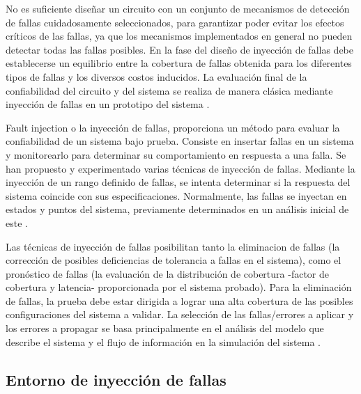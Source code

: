 \par No es suficiente diseñar un circuito con un conjunto de mecanismos de detección de fallas cuidadosamente seleccionados, para garantizar poder evitar los efectos críticos de las fallas, ya que los mecanismos implementados en general no pueden detectar todas las fallas posibles. En la fase del diseño de inyección de fallas debe establecerse un equilibrio entre la cobertura de fallas obtenida para los diferentes tipos de fallas y los diversos costos inducidos. La evaluación final de la confiabilidad del circuito y del sistema se realiza de manera clásica mediante inyección de fallas en un prototipo del sistema \cite{LIB05}.\\
\par Fault injection o la inyección de fallas, proporciona un método para evaluar la confiabilidad de un sistema bajo prueba. Consiste en insertar fallas en un sistema y monitorearlo para determinar su comportamiento en respuesta a una falla. Se han propuesto y experimentado varias técnicas de inyección de fallas. Mediante la inyección de un rango definido de fallas, se intenta determinar si la respuesta del sistema coincide con sus especificaciones. Normalmente, las fallas se inyectan en estados y puntos del sistema, previamente determinados en un análisis inicial de este \cite{LIB05}.\\

\par Las técnicas de inyección de fallas posibilitan tanto la eliminacion de fallas (la corrección de posibles deficiencias de tolerancia a fallas en el sistema), como el pronóstico de fallas (la evaluación de la distribución de cobertura -factor de cobertura y latencia- proporcionada por el sistema probado). Para la eliminación de fallas, la prueba debe estar dirigida a lograr una alta cobertura de las posibles configuraciones del sistema a validar. La selección de las fallas/errores a aplicar y los errores a propagar se basa principalmente en el análisis del modelo que describe el sistema y el flujo de información en la simulación del sistema \cite{LIB05}.

\subsection{Entorno de inyección de fallas}

